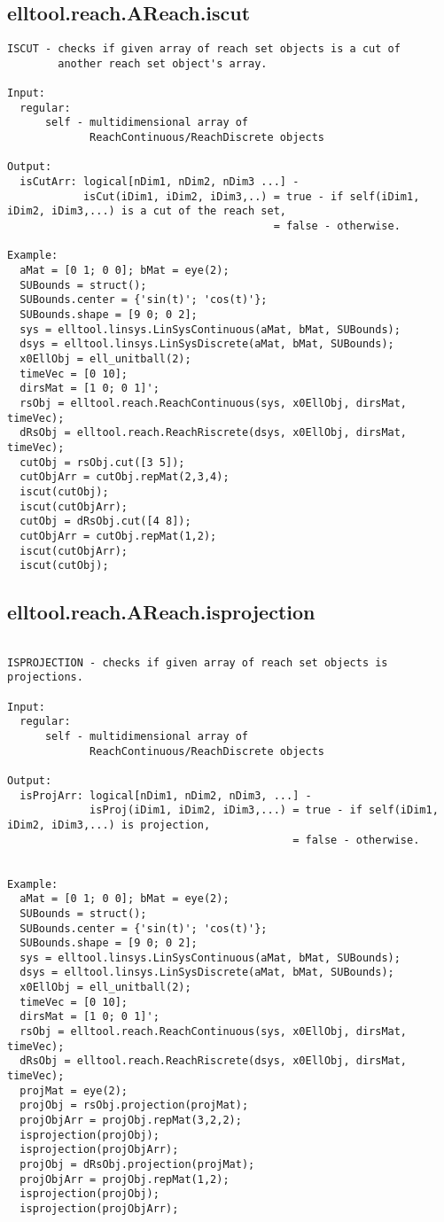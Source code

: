 \subsection{\texorpdfstring{elltool.reach.AReach.iscut}{iscut}}\label{method:elltool.reach.AReach.iscut}
\begin{verbatim}
ISCUT - checks if given array of reach set objects is a cut of
        another reach set object's array.

Input:
  regular:
      self - multidimensional array of
             ReachContinuous/ReachDiscrete objects

Output:
  isCutArr: logical[nDim1, nDim2, nDim3 ...] -
            isCut(iDim1, iDim2, iDim3,..) = true - if self(iDim1, iDim2, iDim3,...) is a cut of the reach set,
                                          = false - otherwise.

Example:
  aMat = [0 1; 0 0]; bMat = eye(2);
  SUBounds = struct();
  SUBounds.center = {'sin(t)'; 'cos(t)'};
  SUBounds.shape = [9 0; 0 2];
  sys = elltool.linsys.LinSysContinuous(aMat, bMat, SUBounds);
  dsys = elltool.linsys.LinSysDiscrete(aMat, bMat, SUBounds);
  x0EllObj = ell_unitball(2);
  timeVec = [0 10];
  dirsMat = [1 0; 0 1]';
  rsObj = elltool.reach.ReachContinuous(sys, x0EllObj, dirsMat, timeVec);
  dRsObj = elltool.reach.ReachRiscrete(dsys, x0EllObj, dirsMat, timeVec);
  cutObj = rsObj.cut([3 5]);
  cutObjArr = cutObj.repMat(2,3,4);
  iscut(cutObj);
  iscut(cutObjArr);
  cutObj = dRsObj.cut([4 8]);
  cutObjArr = cutObj.repMat(1,2);
  iscut(cutObjArr);
  iscut(cutObj);
\end{verbatim}
\subsection{\texorpdfstring{elltool.reach.AReach.isprojection}{isprojection}}\label{method:elltool.reach.AReach.isprojection}
\begin{verbatim}

ISPROJECTION - checks if given array of reach set objects is projections.

Input:
  regular:
      self - multidimensional array of
             ReachContinuous/ReachDiscrete objects

Output:
  isProjArr: logical[nDim1, nDim2, nDim3, ...] -
             isProj(iDim1, iDim2, iDim3,...) = true - if self(iDim1, iDim2, iDim3,...) is projection,
                                             = false - otherwise.


Example:
  aMat = [0 1; 0 0]; bMat = eye(2);
  SUBounds = struct();
  SUBounds.center = {'sin(t)'; 'cos(t)'};
  SUBounds.shape = [9 0; 0 2];
  sys = elltool.linsys.LinSysContinuous(aMat, bMat, SUBounds);
  dsys = elltool.linsys.LinSysDiscrete(aMat, bMat, SUBounds);
  x0EllObj = ell_unitball(2);
  timeVec = [0 10];
  dirsMat = [1 0; 0 1]';
  rsObj = elltool.reach.ReachContinuous(sys, x0EllObj, dirsMat, timeVec);
  dRsObj = elltool.reach.ReachRiscrete(dsys, x0EllObj, dirsMat, timeVec);
  projMat = eye(2);
  projObj = rsObj.projection(projMat);
  projObjArr = projObj.repMat(3,2,2);
  isprojection(projObj);
  isprojection(projObjArr);
  projObj = dRsObj.projection(projMat);
  projObjArr = projObj.repMat(1,2);
  isprojection(projObj);
  isprojection(projObjArr);
\end{verbatim}
